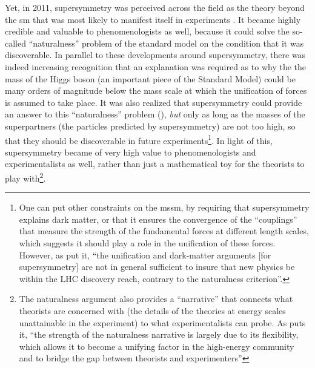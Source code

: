 \documentclass[smallextended]{svjour3}
\begin{document}
Yet, in 2011, supersymmetry was perceived across the field as the theory beyond the \gls{sm} that was most likely to manifest itself in experiments \citep{Mttig2019,Mttig2020a}. It became highly credible and valuable to phenomenologists as well, because it could solve the so-called ``naturalness'' problem of the standard model on the condition that it was discoverable. %
In parallel to these developments around supersymmetry, there was indeed increasing recognition that an explanation was required as to why the the mass of the Higgs boson (an important piece of the Standard Model) could be many orders of magnitude below the mass scale at which the unification of forces is assumed to take place. 
It was also realized that supersymmetry could provide an answer to this ``naturalness''  problem (\citealt{Weinberg1978,Veltman1980,Witten1982de}), \textit{but} only as long as the masses of the superpartners (the particles predicted by supersymmetry) are not too high, so that they should be discoverable in future experiments\footnote{One can put other constraints on the \gls{mssm}, by requiring that supersymmetry explains dark matter, or that it ensures the convergence of the ``couplings'' that measure the strength of the fundamental forces at different length scales, which suggests it should play a role in the unification of these forces. However, as \citealt{Giudice2004} put it, ``the unification and dark-matter arguments [for supersymmetry] are not in general sufficient to insure that new physics be within the LHC discovery reach, contrary to the naturalness criterion''.}. In light of this, supersymmetry became of very high value to phenomenologists and experimentalists as well, rather than just a mathematical toy for the theorists to play with\footnote{The naturalness argument also provides a ``narrative'' that connects what theorists are concerned with (the details of the theories at energy scales unattainable in the experiment) to what experimentalists can probe. As \citet[p.~76]{Borrelli2015} puts it, ``the strength of the naturalness narrative is largely due to its flexibility, which allows it to become a unifying factor in the high-energy community and to bridge the gap between theorists and experimenters''  }.
\end{document}
